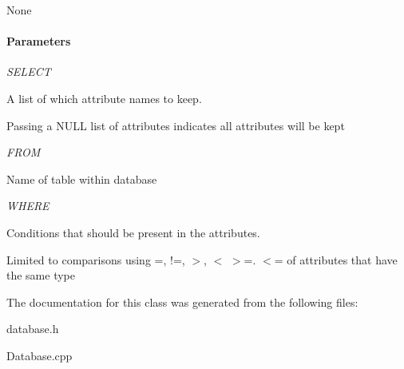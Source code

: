  None

\paragraph*{Parameters}



 {\itshape S\-E\-L\-E\-C\-T}
\begin{DoxyItemize}
\item A list of which attribute names to keep.
\item Passing a N\-U\-L\-L list of attributes indicates all attributes will be kept
\end{DoxyItemize}

{\itshape F\-R\-O\-M}
\begin{DoxyItemize}
\item Name of table within database
\end{DoxyItemize}

{\itshape W\-H\-E\-R\-E}
\begin{DoxyItemize}
\item Conditions that should be present in the attributes.
\item Limited to comparisons using =, !=, $>$, $<$ $>$=. $<$= of attributes that have the same type 
\end{DoxyItemize}

The documentation for this class was generated from the following files\-:\begin{DoxyCompactItemize}
\item 
database.\-h\item 
Database.\-cpp\end{DoxyCompactItemize}
